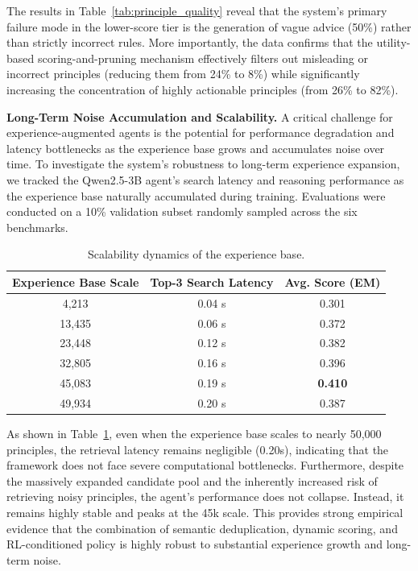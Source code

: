 The results in Table~\ref{tab:principle_quality} reveal that the system's primary failure mode in the lower-score tier is the generation of vague advice (50\%) rather than strictly incorrect rules. More importantly, the data confirms that the utility-based scoring-and-pruning mechanism effectively filters out misleading or incorrect principles (reducing them from 24\% to 8\%) while significantly increasing the concentration of highly actionable principles (from 26\% to 82\%).

\textbf{Long-Term Noise Accumulation and Scalability.} 
A critical challenge for experience-augmented agents is the potential for performance degradation and latency bottlenecks as the experience base grows and accumulates noise over time. To investigate the system's robustness to long-term experience expansion, we tracked the Qwen2.5-3B agent's search latency and reasoning performance as the experience base naturally accumulated during training. Evaluations were conducted on a 10\% validation subset randomly sampled across the six benchmarks.

\begin{table}[ht]
\centering
\caption{Scalability dynamics of the experience base.}
\label{tab:scalability}
\begin{tabular}{ccc}
\toprule
\textbf{Experience Base Scale} & \textbf{Top-3 Search Latency} & \textbf{Avg. Score (EM)} \\
\midrule
4,213 & 0.04 s & 0.301 \\
13,435 & 0.06 s & 0.372 \\
23,448 & 0.12 s & 0.382 \\
32,805 & 0.16 s & 0.396 \\
45,083 & 0.19 s & \textbf{0.410} \\
49,934 & 0.20 s & 0.387 \\
\bottomrule
\end{tabular}
\end{table}

As shown in Table~\ref{tab:scalability}, even when the experience base scales to nearly 50,000 principles, the retrieval latency remains negligible (0.20s), indicating that the framework does not face severe computational bottlenecks. Furthermore, despite the massively expanded candidate pool and the inherently increased risk of retrieving noisy principles, the agent's performance does not collapse. Instead, it remains highly stable and peaks at the 45k scale. This provides strong empirical evidence that the combination of semantic deduplication, dynamic scoring, and RL-conditioned policy is highly robust to substantial experience growth and long-term noise.





